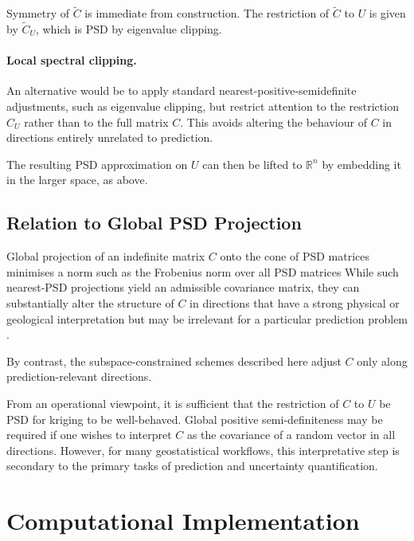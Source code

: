 \documentclass[smallextended]{svjour3}
\newcommand{\R}{\mathbb{R}}
\newcommand{\1}{\mathbf{1}}
\let\oldproof\proof
\let\endoldproof\endproof
\renewenvironment{proof}{\oldproof\upshape}{\endoldproof}
\begin{document}
\begin{proof}
Symmetry of $\tilde{C}$ is immediate from construction.
The restriction of $\tilde{C}$ to $U$ is given by $\tilde{C}_U$, which is PSD by eigenvalue clipping.
\end{proof}	
\paragraph{Local spectral clipping.}
An alternative would be to apply standard nearest-positive-semidefinite adjustments, such as eigenvalue clipping, but restrict attention to the restriction $C_U$ rather than to the full matrix $C$.
This avoids altering the behaviour of $C$ in directions entirely unrelated to prediction.

The resulting PSD approximation on $U$ can then be lifted to $\R^n$ by embedding it in the larger space, as above.

\subsection{Relation to Global PSD Projection}

Global projection of an indefinite matrix $C$ onto the cone of PSD matrices minimises a norm such as the Frobenius norm over all PSD matrices \citep{Higham1988,Higham2002} 
While such nearest-PSD projections yield an admissible covariance matrix, they can substantially alter the structure of $C$ in directions that have a strong physical or geological interpretation but may be irrelevant for a particular prediction problem \citep[cf.][]{chilesdelfiner2012}.

By contrast, the subspace-constrained schemes described here adjust $C$ only along prediction-relevant directions.

From an operational viewpoint, it is sufficient that the restriction of $C$ to $U$ be PSD for kriging to be well-behaved.
Global positive semi-definiteness may be required if one wishes to interpret $C$ as the covariance of a random vector in all directions.
However, for many geostatistical workflows, this interpretative step is secondary to the primary tasks of prediction and uncertainty quantification.

	
			
\section{Computational Implementation}
\label{sec:implementation}
\end{document}
